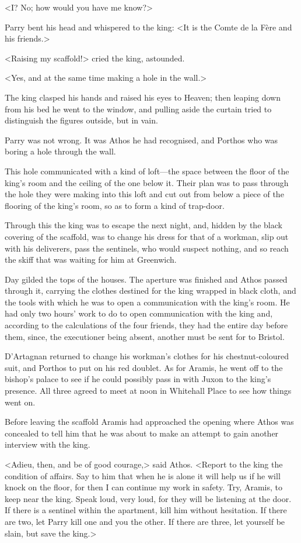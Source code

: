 <I? No; how would you have me know?>

Parry bent his head and whispered to the king: <It is the Comte de la Fère and his friends.>

<Raising my scaffold!> cried the king, astounded.

<Yes, and at the same time making a hole in the wall.>

The king clasped his hands and raised his eyes to Heaven; then leaping down from his bed he went to the window, and pulling aside the curtain tried to distinguish the figures outside, but in vain.

Parry was not wrong. It was Athos he had recognised, and Porthos who was boring a hole through the wall.

This hole communicated with a kind of loft—the space between the floor of the king's room and the ceiling of the one below it. Their plan was to pass through the hole they were making into this loft and cut out from below a piece of the flooring of the king's room, so as to form a kind of trap-door.

Through this the king was to escape the next night, and, hidden by the black covering of the scaffold, was to change his dress for that of a workman, slip out with his deliverers, pass the sentinels, who would suspect nothing, and so reach the skiff that was waiting for him at Greenwich.

Day gilded the tops of the houses. The aperture was finished and Athos passed through it, carrying the clothes destined for the king wrapped in black cloth, and the tools with which he was to open a communication with the king's room. He had only two hours' work to do to open communication with the king and, according to the calculations of the four friends, they had the entire day before them, since, the executioner being absent, another must be sent for to Bristol.

D'Artagnan returned to change his workman's clothes for his chestnut-coloured suit, and Porthos to put on his red doublet. As for Aramis, he went off to the bishop's palace to see if he could possibly pass in with Juxon to the king's presence. All three agreed to meet at noon in Whitehall Place to see how things went on.

Before leaving the scaffold Aramis had approached the opening where Athos was concealed to tell him that he was about to make an attempt to gain another interview with the king.

<Adieu, then, and be of good courage,> said Athos. <Report to the king the condition of affairs. Say to him that when he is alone it will help us if he will knock on the floor, for then I can continue my work in safety. Try, Aramis, to keep near the king. Speak loud, very loud, for they will be listening at the door. If there is a sentinel within the apartment, kill him without hesitation. If there are two, let Parry kill one and you the other. If there are three, let yourself be slain, but save the king.>

